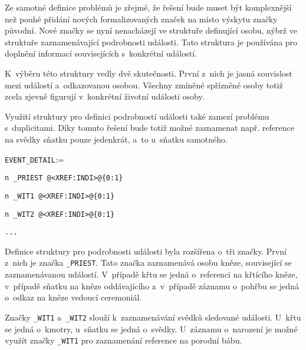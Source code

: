 		Ze samotné definice problémů je zřejmé, že řešení bude muset být komplexnější než pouhé přidání nových formalizovaných značek na místo výskytu značky původní. Nové značky se nyní nenacházejí ve struktuře definující osobu, nýbrž ve struktuře zaznamenávající podrobnosti události. Tato struktura je používána pro doplnění informací souvisejících s~konkrétní událostí. \par
		K~výběru této struktury vedly dvě skutečnosti. První z~nich je jasná souvislost mezi událostí a~odkazovanou osobou. Všechny zmíněné spřízněné osoby totiž zcela zjevně figurují v~konkrétní životní události osoby. \par
		Využití struktury pro definici podrobností události také zamezí problému s~duplicitami. Díky tomuto řešení bude totiž možné zaznamenat např. reference na svědky sňatku pouze jedenkrát, a~to u~sňatku samotného. \par
		\vspace{1em}
		\verb|EVENT_DETAIL|:=\par
		\quad \verb|n _PRIEST @<XREF:INDI>@|\hfill\verb|{0:1}|\par
		\quad \verb|n _WIT1 @<XREF:INDI>@|\hfill\verb|{0:1}|\par
		\quad \verb|n _WIT2 @<XREF:INDI>@|\hfill\verb|{0:1}|\par
		\quad \verb|...|\par
		\vspace{1em}
		 
		Definice struktury pro podrobnosti události byla rozšířena o~tři značky. První z~nich je značka \verb|_PRIEST|. Tato značka zaznamenává osobu kněze, související se zaznamenávanou událostí. V~případě křtu se jedná o~referenci na křtícího kněze, v~případě sňatku na kněze oddávajícího a~v~případě záznamu o~pohřbu se jedná o~odkaz na kněze vedoucí ceremoniál.\par
		Značky \verb|_WIT1| a~\verb|_WIT2| slouží k~zaznamenávání svědků sledované události. U~křtu se jedná o~kmotry, u~sňatku se jedná o~svědky. U~záznamu o~narození je možné využít značky \verb|_WIT1| pro zaznamenání reference na porodní bábu.\par
		
		
	\newpage	
			
